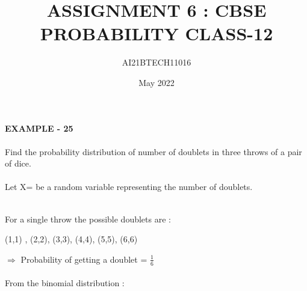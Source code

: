 \documentclass[journal,12pt,twocolumn]{IEEEtran}
\begin{document}
\vspace{3cm}
       
\title{ASSIGNMENT 6 : CBSE PROBABILITY CLASS-12} 
\author{AI21BTECH11016} 
\date{May 2022}     


\maketitle

\newpage

\bigskip


\textbf{EXAMPLE - 25}\\

\question \\
Find the probability distribution of number of doublets in three throws of
a pair of dice.\\

\solution \\
Let X= be a random variable representing the number of doublets.\\\\

\begin{table}[ht!]
    \centering
    
    \caption{}
    \label{table:table1}
\end{table}

\text For a single throw the possible doublets are :
\begin{center}
\text (1,1) , (2,2), (3,3), (4,4), (5,5), (6,6)
\end{center}
$\Rightarrow$ Probability of getting a doublet = $\frac{1}{6}$ \\\\
\text From the binomial distribution :\\
\end{document}
